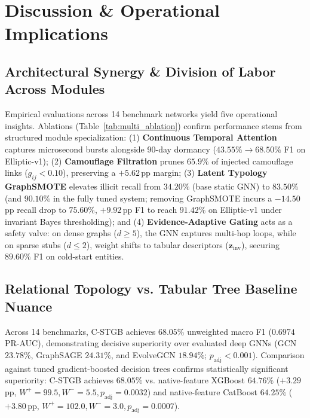\section{Discussion \& Operational Implications}
\label{sec:discussion}

\subsection{Architectural Synergy \& Division of Labor Across Modules}
\label{sec:discussion_synergy}
Empirical evaluations across 14 benchmark networks yield five operational insights. Ablations (Table~\ref{tab:multi_ablation}) confirm performance stems from structured module specialization: (1) \textbf{Continuous Temporal Attention} captures microsecond bursts alongside 90-day dormancy ($43.55\% \to 68.50\%$ F1 on Elliptic-v1); (2) \textbf{Camouflage Filtration} prunes $65.9\%$ of injected camouflage links ($g_{ij} < 0.10$), preserving a $+5.62$\,pp margin; (3) \textbf{Latent Typology GraphSMOTE} elevates illicit recall from $34.20\%$ (base static GNN) to $83.50\%$ (and $90.10\%$ in the fully tuned system; removing GraphSMOTE incurs a $-14.50$\,pp recall drop to $75.60\%$, $+9.92$\,pp F1 to reach $91.42\%$ on Elliptic-v1 under invariant Bayes thresholding); and (4) \textbf{Evidence-Adaptive Gating} acts as a safety valve: on dense graphs ($d \ge 5$), the GNN captures multi-hop loops, while on sparse stubs ($d \le 2$), weight shifts to tabular descriptors ($\mathbf{z}_{\text{inv}}$), securing $89.60\%$ F1 on cold-start entities.

\subsection{Relational Topology vs. Tabular Tree Baseline Nuance}
\label{sec:discussion_trees_vs_gnns}
Across 14 benchmarks, C-STGB achieves $68.05\%$ unweighted macro F1 ($0.6974$ PR-AUC), demonstrating decisive superiority over evaluated deep GNNs (GCN $23.78\%$, Graph\-SAGE $24.31\%$, and EvolveGCN $18.94\%$; $p_{\text{adj}} < 0.001$). Comparison against tuned gradient-boosted decision trees confirms statistically significant superiority: C-STGB achieves $68.05\%$ vs. native-feature XGBoost $64.76\%$ ($+3.29$\,pp, $W^+=99.5, W^-=5.5, p_{\text{adj}}=0.0032$) and native-feature CatBoost $64.25\%$ ($+3.80$\,pp, $W^+=102.0, W^-=3.0, p_{\text{adj}}=0.0007$).

